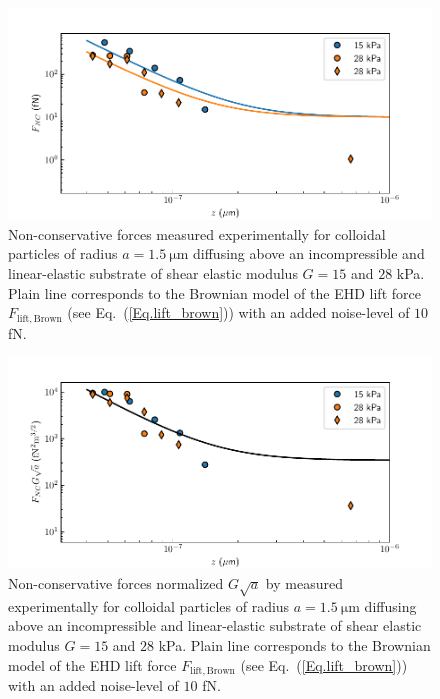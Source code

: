 \begin{figure}[H]
	\centering
	\includegraphics{02_body/chapter4/images/EHD_forces/EHD_force.pdf}
	\caption{Non-conservative forces measured experimentally for colloidal particles of radius $a=1.5 ~\mathrm{\mu m}$ diffusing above an incompressible and linear-elastic substrate of shear elastic modulus $G=15$ and $28$ kPa. Plain line corresponds to the Brownian model of the \gls{EHD} lift force $F_\mathrm{lift, Brown}$ (see Eq.~(\ref{Eq.lift_brown})) with an added noise-level of $10$ fN.}
	\label{fig.ncforce}
\end{figure}

\begin{figure}[H]
	\centering
	\includegraphics{02_body/chapter4/images/EHD_forces/EHD_force_rescale.pdf}
	\caption{Non-conservative forces  normalized $ G\sqrt{a} $ by measured experimentally for colloidal particles of radius $a=1.5 ~\mathrm{\mu m}$ diffusing above an incompressible and linear-elastic substrate of shear elastic modulus $G=15$ and $28$ kPa. Plain line corresponds to the Brownian model of the \gls{EHD} lift force $F_\mathrm{lift, Brown}$ (see Eq.~(\ref{Eq.lift_brown})) with an added noise-level of $10$ fN.}
	\label{fig.ncforcenormalized}
\end{figure}


